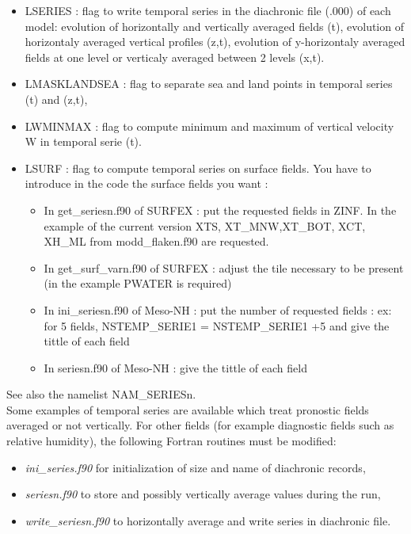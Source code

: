 \begin{itemize}
\item LSERIES :
 flag to write temporal series in the diachronic file (.000) of each model:
evolution of horizontally and vertically averaged fields (t), 
evolution of horizontaly averaged vertical profiles (z,t), 
evolution of y-horizontaly averaged fields at one level or verticaly averaged between 2 levels (x,t). 
\item LMASKLANDSEA :
 flag to separate sea and land points in temporal series (t) and (z,t),
\item LWMINMAX :
 flag to compute minimum and maximum of vertical velocity W in temporal serie
(t).
\item LSURF : flag to compute temporal series on surface fields.
You have to introduce in the code the surface fields you want  : 
\begin{itemize}
\item In  get\_seriesn.f90 of SURFEX : put the requested fields in ZINF. In the example of the current version XTS, XT\_MNW,XT\_BOT, XCT, XH\_ML from modd\_flaken.f90 are requested.
\item In get\_surf\_varn.f90 of SURFEX : adjust the tile necessary to be present (in the example PWATER is required)
\item In ini\_seriesn.f90 of Meso-NH : put the number of requested fields  : ex: for 5 fields, NSTEMP\_SERIE1 = NSTEMP\_SERIE1 +5 and give the tittle of each field
\item In seriesn.f90 of Meso-NH : give the tittle of each field
\end{itemize}
\end{itemize}
See also the namelist NAM\_SERIESn. \\

Some examples of temporal series are available which treat pronostic fields 
averaged or not vertically. For other fields (for example diagnostic
fields such as relative humidity), the following Fortran
routines must be modified:
\begin{itemize}
\item  {\it ini\_series.f90} for initialization of size and name of diachronic
records,
\item  {\it seriesn.f90} to store and possibly vertically average values 
during the run,
\item  {\it write\_seriesn.f90} to horizontally average and write series in
diachronic file.
\end{itemize}
